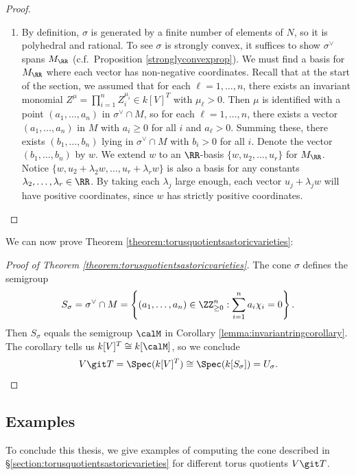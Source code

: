 \documentclass[12pt]{amsart}
\theoremstyle{plain}
\theoremstyle{definition}
\begin{document}
\begin{proof}
\begin{enumerate}
\item
By definition, $\sigma$ is generated by a finite number of elements of $N$, so it is polyhedral and rational.
To see $\sigma$ is strongly convex, it suffices to show $\sigma^\vee$ spans $M_\RR$ (c.f.\ Proposition \ref{stronglyconvexprop}).
We must find a basis for $M_\RR$ where each vector has non-negative coordinates.
Recall that at the start of the section, we assumed that for each $\ell =1, \ldots, n$, there exists an invariant monomial $Z^\mu = \prod_{i=1}^n Z_i^{\mu_i} \in k[V]^T$ with $\mu_\ell > 0$.
Then $\mu$ is identified with a point $(a_1, \ldots, a_n)$ in $\sigma^\vee \cap M$, so for each $\ell = 1, \ldots, n$, there exists a vector $(a_1, \ldots, a_n)$ in $M$ with $a_i \ge 0$ for all $i$ and $a_\ell > 0$.
Summing these, there exists $(b_1, \ldots, b_n)$ lying in $\sigma^\vee \cap M$ with $b_i > 0$ for all $i$.
Denote the vector $(b_1, \ldots, b_n)$ by $w$.
We extend $w$ to an $\RR$-basis $\{w, u_2, \ldots, u_r\}$ for $M_\RR$.
Notice $\{w, u_2 + \lambda_2 w, \ldots, u_r + \lambda_r w\}$ is also a basis for any constants $\lambda_2, \ldots, \lambda_r \in \RR$.
By taking each $\lambda_j$ large enough, each vector $u_j + \lambda_j w$ will have positive coordinates, since $w$ has strictly positive coordinates.
\end{enumerate}
\end{proof}

We can now prove Theorem \ref{theorem:torusquotientsastoricvarieties}:

\begin{proof}[Proof of Theorem \ref{theorem:torusquotientsastoricvarieties}]
The cone $\sigma$ defines the semigroup
$$S_\sigma = \sigma^\vee \cap M = \left\{(a_1, \ldots, a_n) \in \ZZ_{\ge 0}^n : \sum_{i=1}^n a_i \chi_i = 0 \right\}.$$
Then $S_\sigma$ equals the semigroup $\calM$ in Corollary \ref{lemma:invariantringcorollary}.
The corollary tells us $k[V]^T \cong k[\calM]$, so we conclude
$$V \git T = \Spec(k[V]^T) \cong \Spec(k[S_\sigma]) = U_\sigma.$$
\end{proof}





\subsection{Examples}\label{section:examples}
To conclude this thesis, we give examples of computing the cone described in \S \ref{section:torusquotientsastoricvarieties} for different torus quotients $V \git T$. \\
\end{document}
